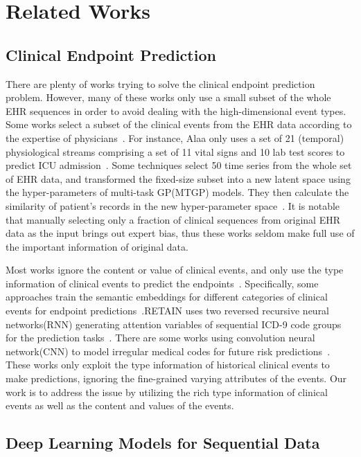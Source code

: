 \documentclass[letterpaper]{article} %
\begin{document}
\section{Related Works}
\subsection{Clinical Endpoint Prediction}
There are plenty of works trying to solve the clinical endpoint prediction problem. However, many of these works only use a small subset of the whole EHR sequences in order to avoid dealing with the high-dimensional event types. Some works select a subset of the clinical events from the EHR data according to the expertise of physicians~\cite{caballero2015dynamically}. For instance,  Alaa
only uses a set of 21 (temporal) physiological streams comprising a set of 11 vital signs and 10 lab test scores to predict ICU admission~\cite{alaa2017learning}.  Some techniques select 50 time series from the whole set of EHR data, and transformed the fixed-size subset into a new latent space using the hyper-parameters of multi-task GP(MTGP) models. They then calculate the similarity of patient's records in the new hyper-parameter space~\cite{ghassemi2015multivariate}. It is notable that manually selecting only a fraction of clinical sequences from original EHR data as the input brings out expert bias, thus these works seldom make full use of the important information of original data.

Most works ignore the content or value of clinical events, and only use the type information of clinical events to predict the endpoints~\cite{Liu2015Temporal}. Specifically,  some approaches train the semantic embeddings for different categories of clinical events for endpoint predictions~\cite{Henriksson2015Modeling}.RETAIN uses two reversed recursive neural networks(RNN) generating attention variables of sequential ICD-9 code groups for the prediction tasks~\cite{choi2016retain}. There are some works using convolution neural network(CNN) to model irregular medical codes for future risk predictions~\cite{nguyen2016deepr}. These works only exploit the type information of historical clinical events to make predictions, ignoring the fine-grained varying attributes of the events. Our work is to address the issue by utilizing the rich type information of clinical events as well as the content and values of the events.

\subsection{Deep Learning Models for Sequential Data}
\end{document}
